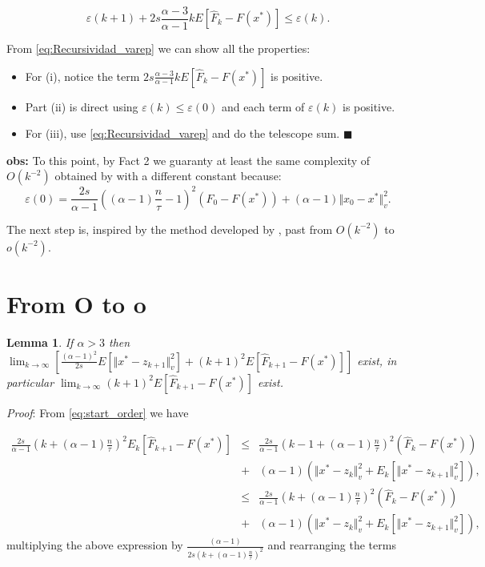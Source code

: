\documentclass{article}
\newcommand{\x}{x^*}
\newtheorem{lema}{Lemma}
\begin{document}
\begin{equation}
\label{eq:Recursividad_varep}
\varepsilon(k+1) + 2s\frac{\alpha-3}{\alpha-1}kE\left[\hat{F}_k - F(\x) \right] \leq \varepsilon(k).
\end{equation}

From \eqref{eq:Recursividad_varep} we can show all the properties:
\begin{itemize}
	\item For (i), notice the term $\displaystyle 2s\frac{\alpha-3}{\alpha-1}kE\left[\hat{F}_k - F(\x) \right]$ is positive.
	\item Part (ii) is direct using $\varepsilon(k) \leq \varepsilon(0)$ and each term of $\varepsilon(k)$ is positive.
	\item For (iii), use \eqref{eq:Recursividad_varep} and do the telescope sum. $\blacksquare$
\end{itemize}
\textbf{obs:} To this point, by Fact 2 we guaranty at least the same complexity of $O(k^{-2})$ obtained by \cite{Fercoq_Richtarik} with a different constant because:
	\begin{equation*}
		\varepsilon(0) = \frac{2s}{\alpha-1}\left((\alpha-1)\frac{n}{\tau} -1 \right)^2\left(F_0 -F(\x) \right) + (\alpha-1)\Vert x_0 - \x \Vert^2_v.
	\end{equation*} 

The next step is, inspired by the method developed by \cite{HA_JP}, past from $O(k^{-2})$ to $o(k^{-2})$.

\section*{From O to o}

\begin{lema}
If $\alpha > 3$ then $\displaystyle \lim_{k \rightarrow \infty} \left[ \frac{(\alpha-1)^2}{2s} E \left[ \Vert x^* - z_{k+1} \Vert_v^2 \right] + \left(k+1 \right)^2 E\left[\hat{F}_{k+1}-F(\x) \right] \right]$ exist, in particular $\displaystyle \lim_{k \rightarrow \infty } \left(k+1 \right)^2 E\left[\hat{F}_{k+1}-F(\x) \right] $ exist.
\label{lema_5}
\end{lema}

\emph{Proof}: From \eqref{eq:start_order} we have

\begin{eqnarray*}
\frac{2s}{\alpha-1} \left( k+(\alpha-1)\frac{n}{\tau}  \right)^2 E_k[\hat{F}_{k+1}-F(\x)] &\leq & \frac{2s}{\alpha-1} \left(k-1+(\alpha-1)\frac{n}{\tau} \right)^2 \left(\hat{F}_k- F(\x) \right) \\
&+& (\alpha-1)\left(\Vert \x - z_k \Vert_v^2 + E_k[\Vert \x-z_{k+1} \Vert_v^2]  \right), \\
&\leq & \frac{2s}{\alpha-1} \left(k+(\alpha-1)\frac{n}{\tau} \right)^2 \left(\hat{F}_k- F(\x) \right) \\
&+& (\alpha-1)\left(\Vert \x - z_k \Vert_v^2 + E_k[\Vert \x-z_{k+1} \Vert_v^2]  \right),
\end{eqnarray*}
multiplying the above expression by $\frac{(\alpha-1)}{2s\left(k+(\alpha-1)\frac{n}{\tau} \right)^2}$ and rearranging the terms
\end{document}
